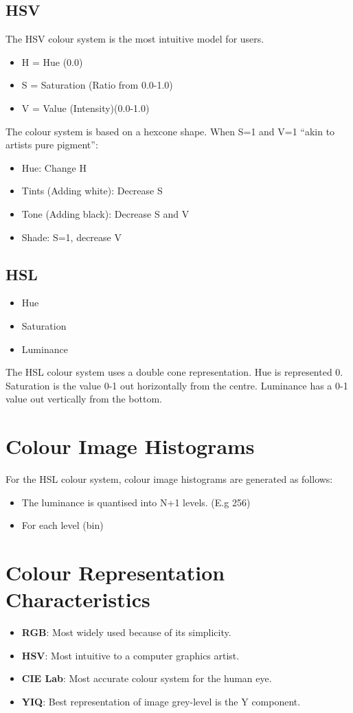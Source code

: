 \documentclass{article}
\begin{document}
\subsection{HSV}
The HSV colour system is the most intuitive model for users.
\begin{itemize}
	\item H = Hue (0.0\degree)
	\item S = Saturation (Ratio from 0.0-1.0)
	\item V = Value (Intensity)(0.0-1.0)
\end{itemize}
The colour system is based on a hexcone shape.
When S=1 and V=1 ``akin to artists pure pigment'':
\begin{itemize}
	\item Hue: Change H
	\item Tints (Adding white): Decrease S
	\item Tone (Adding black): Decrease S and V
	\item Shade: S=1, decrease V
\end{itemize}

\subsection{HSL}
\begin{itemize}
	\item Hue
	\item Saturation
	\item Luminance
\end{itemize}
The HSL colour system uses a double cone representation.
Hue is represented 0\degree.
Saturation is the value 0-1 out horizontally from the centre.
Luminance has a 0-1 value out vertically from the bottom.

\section{Colour Image Histograms}
For the HSL colour system, colour image histograms are generated as follows:
\begin{itemize}
	\item The luminance is quantised into N+1 levels. (E.g 256)
	\item For each level (bin)
\end{itemize}

\section{Colour Representation Characteristics}
\begin{itemize}
	\item \textbf{RGB}: Most widely used because of its simplicity. 
	\item \textbf{HSV}: Most intuitive to a computer graphics artist. 
	\item \textbf{CIE Lab}: Most accurate colour system for the human eye. 
	\item \textbf{YIQ}: Best representation of image grey-level is the Y component. 
\end{itemize}
\end{document}

